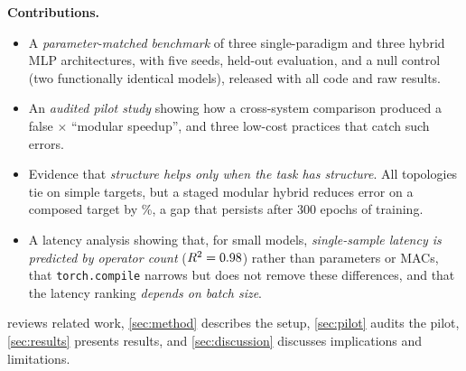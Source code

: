 \textbf{Contributions.}
\begin{itemize}
\item A \emph{parameter-matched benchmark} of three single-paradigm and three hybrid MLP architectures,
with five seeds, held-out evaluation, and a null control (two functionally identical models), released
with all code and raw results.
\item An \emph{audited pilot study} showing how a cross-system comparison produced a false
\pilotSpeedup$\times$ ``modular speedup'', and three low-cost practices that catch such errors.
\item Evidence that \emph{structure helps only when the task has structure}. All topologies tie on simple
targets, but a staged modular hybrid reduces error on a composed target by \chainHBGain\%, a gap that persists after
300 epochs of training.
\item A latency analysis showing that, for small models, \emph{single-sample latency is predicted by operator
count} ($R^2=0.98$) rather than parameters or MACs, that \texttt{torch.compile} narrows but does not remove these differences,
and that the latency ranking \emph{depends on batch size}.
\end{itemize}

 reviews related work, \cref{sec:method} describes the setup, \cref{sec:pilot} audits the pilot,
\cref{sec:results} presents results, and \cref{sec:discussion} discusses implications and limitations.
